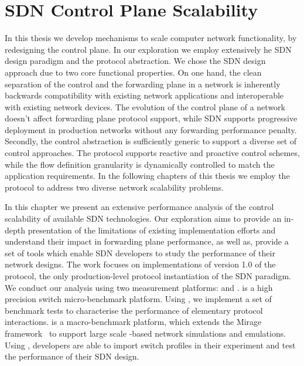 \chapter{SDN Control Plane Scalability} \label{sec:sdn_scalability} 
\ifpdf
    \graphicspath{{Chapter1/Chapter1Figs/PNG/}{Chapter1/Chapter1Figs/PDF/}{Chapter1/Chapter1Figs/}}
\else
    \graphicspath{{Chapter1/Chapter1Figs/EPS/}{Chapter1/Chapter1Figs/}}
\fi

In this thesis we develop mechanisms to scale computer network functionality, by
redesigning the control plane.  In our exploration we employ extensively  he SDN
design paradigm and the \of protocol abstraction.  We chose the SDN design
approach due to two core functional properties.  On one hand, the clean
separation of the control and the forwarding plane in a network is inherently
backwards compatibility with existing network applications and interoperable
with existing network devices.  The evolution of the control plane of a network
doesn't affect forwarding plane protocol support, while SDN supports progressive
deployment in production networks without any forwarding performance penalty.
Secondly, the \of control abstraction is sufficiently generic to support a
diverse set of control approaches. The protocol supports reactive and proactive
control schemes, while the flow definition granularity is dynamically controlled
to match the application requirements. In the following chapters of this thesis
we employ the \of protocol to address two diverse network scalability problems. 

In this chapter we present an extensive performance analysis of the control
scalability of available SDN technologies. Our exploration aims to provide an 
in-depth presentation of the limitations of existing implementation efforts and
understand their impact in forwarding plane performance, as well as, provide a
set of tools which enable SDN developers to study the performance of their
network designs. The work focuses on implementations of version 1.0 of the \of
protocol, the only production-level protocol instantiation of the SDN paradigm.
We conduct our analysis using two measurement platforms: \oflops and \sdnsim.
\oflops is a high precision \of switch micro-benchmark platform. Using \oflops,
we implement a set of benchmark tests to characterise the performance of elementary
\of protocol interactions. \sdnsim is a macro-benchmark \of platform, which
extends the Mirage framework~\cite{madhavapeddy2013} to support large scale
\of-based network simulations and emulations.  Using \sdnsim, developers are
able to import \oflops switch profiles in their experiment and test the
performance of their SDN design.

